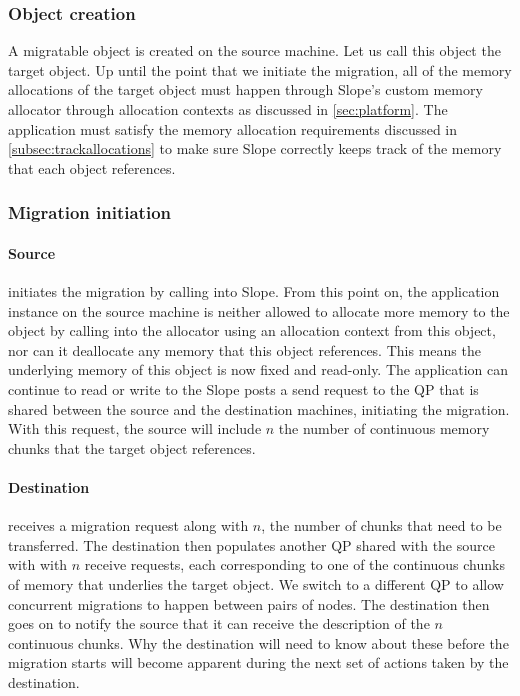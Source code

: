 \subsubsection{Object creation}
A migratable object is created on the source machine. Let us call this object
the target object. Up until the point that
we initiate the migration, all of the memory allocations of the target object
must happen through
Slope's custom memory allocator through allocation contexts as discussed in
\ref{sec:platform}.
The application must satisfy the memory allocation requirements discussed in
\ref{subsec:trackallocations} to make sure Slope correctly keeps track of the
memory that each object references.

\subsubsection{Migration initiation}

\paragraph{Source}
initiates the migration by calling into Slope. From this point
on, the application instance on the source machine is neither allowed to
allocate more memory to the object by calling into the allocator using
an allocation context from this object, nor can it deallocate any memory that
this object references. This means the underlying memory of this object is now
fixed and read-only. The application can continue to read or write to the
Slope posts a send request to the QP that is shared
between the source and the destination machines, initiating the migration.
With this request, the source will include $n$ the number of continuous memory
chunks that the target object references.

\paragraph{Destination}
receives a migration request along with $n$, the number of chunks that need to
be transferred. The destination then populates another QP shared with the source
with with $n$ receive requests, each corresponding to one of the continuous
chunks of memory that underlies the target object. We switch to a different QP
to allow concurrent migrations to happen between pairs of nodes. The destination
then goes on to notify the source that it can receive the description of the $n$
continuous chunks. Why the destination will need to know about these before the
migration starts will become apparent during the next set of actions taken by
the destination.

